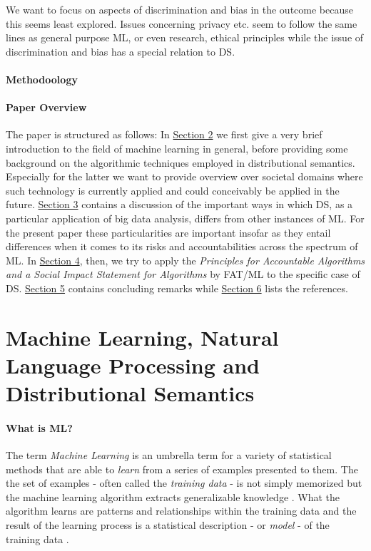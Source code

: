 \documentclass{article}
\begin{document}
We want to focus on aspects of discrimination and bias in the outcome because this seems least explored. Issues concerning privacy etc. seem to follow the same lines as general purpose ML, or even research, ethical principles while the issue of discrimination and bias has a special relation to DS.

\paragraph{Methodoology}

\paragraph{Paper Overview}
The paper is structured as follows: In \hyperlink{sec2}{Section 2} we first give a very brief introduction to the field of machine learning in general, before providing some background on the algorithmic techniques employed in distributional semantics. Especially for the latter we want to provide overview over societal domains where such technology is currently applied and could conceivably be applied in the future. \hyperlink{sec3}{Section 3} contains a discussion of the important ways in which DS, as a particular application of big data analysis, differs from other instances of ML. For the present paper these particularities are important insofar as they entail differences when it comes to its risks and accountabilities across the spectrum of ML. In \hyperlink{sec4}{Section 4}, then, we try to apply the \emph{Principles for Accountable Algorithms and a Social Impact Statement for Algorithms} by FAT/ML to the specific case of DS. \hyperlink{sec5}{Section 5} contains concluding remarks while \hyperlink{sec6}{Section 6} lists the references.
\section{Machine Learning, Natural Language Processing and Distributional Semantics}\hypertarget{sec3}{ }
\paragraph{What is ML?}
The term \emph{Machine Learning} is an umbrella term for a variety of statistical methods that are able to \emph{learn} from a series of examples presented to them. The the set of examples - often called the \emph{training data} - is not simply memorized but the machine learning algorithm extracts generalizable knowledge \cite{domingos2012few}.
 What the algorithm learns are patterns and relationships within the training data and the result of the learning process is a statistical description - or \emph{model} - of the training data \cite{fayyad2001digital}.
\end{document}
